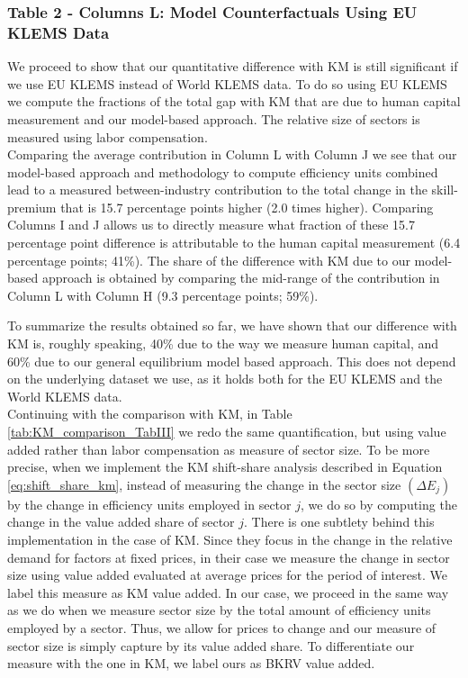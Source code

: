 \documentclass[10pt]{article}
\begin{document}
\subsubsection*{Table 2 - Columns L: Model Counterfactuals Using EU KLEMS Data}
We proceed to show that our quantitative difference with KM is still significant if we use EU KLEMS instead of World KLEMS data. To do so using EU KLEMS we compute the fractions of the total gap with KM that are due to human capital measurement and our model-based approach. The relative size of sectors is measured using labor compensation.\\

Comparing the average contribution in Column L with Column J we see that our model-based approach and methodology to compute efficiency units combined lead to a measured between-industry contribution to the total change in the skill-premium that is 15.7 percentage points higher (2.0 times higher). Comparing Columns I and J allows us to directly measure what fraction of these 15.7 percentage point difference is attributable to the human capital measurement (6.4 percentage points; 41\%). The share of the difference with KM due to our model-based approach is obtained by comparing the mid-range of the contribution in Column L with Column H (9.3 percentage points; 59\%).  

To summarize the results obtained so far, we have shown that our difference with KM is, roughly speaking, 40\% due to the way we measure human capital, and 60\% due to our general equilibrium model based approach. This does not depend on the underlying dataset we use, as it holds both for the EU KLEMS and the World KLEMS data.\\

Continuing with the comparison with KM, in Table \ref{tab:KM_comparison_TabIII} we redo the same quantification, but using value added rather than labor compensation as measure of sector size. To be more precise, when we implement the KM shift-share analysis described in Equation \ref{eq:shift_share_km}, instead of measuring the change in the sector size $(\Delta E_{j})$ by the change in efficiency units employed in sector $j$, we do so by computing the change in the value added share of sector $j$. There is one subtlety behind this implementation in the case of KM. Since they focus in the change in the relative demand for factors at fixed prices, in their case we measure the change in sector size using value added evaluated at average prices for the period of interest. We label this measure as KM value added. In our case, we proceed in the same way as we do when we measure sector size by the total amount of efficiency units employed by a sector. Thus, we allow for prices to change and our measure of sector size is simply capture by its value added share. To differentiate our measure with the one in KM, we label ours as BKRV value added.\\
\end{document}

